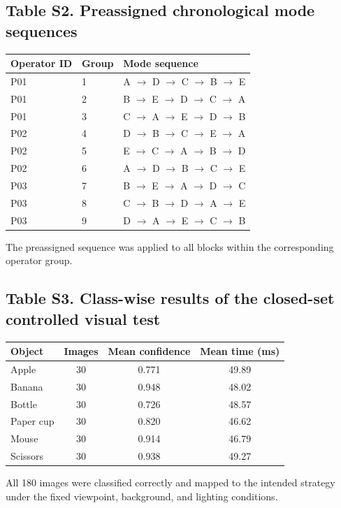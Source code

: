 \documentclass[11pt]{article}
\begin{document}
\subsection*{Table S2. Preassigned chronological mode sequences}
\begin{tabular}{lll}
\toprule
Operator ID & Group & Mode sequence \\
\midrule
P01 & 1 & A $\rightarrow$ D $\rightarrow$ C $\rightarrow$ B $\rightarrow$ E \\
P01 & 2 & B $\rightarrow$ E $\rightarrow$ D $\rightarrow$ C $\rightarrow$ A \\
P01 & 3 & C $\rightarrow$ A $\rightarrow$ E $\rightarrow$ D $\rightarrow$ B \\
P02 & 4 & D $\rightarrow$ B $\rightarrow$ C $\rightarrow$ E $\rightarrow$ A \\
P02 & 5 & E $\rightarrow$ C $\rightarrow$ A $\rightarrow$ B $\rightarrow$ D \\
P02 & 6 & A $\rightarrow$ D $\rightarrow$ B $\rightarrow$ C $\rightarrow$ E \\
P03 & 7 & B $\rightarrow$ E $\rightarrow$ A $\rightarrow$ D $\rightarrow$ C \\
P03 & 8 & C $\rightarrow$ B $\rightarrow$ D $\rightarrow$ A $\rightarrow$ E \\
P03 & 9 & D $\rightarrow$ A $\rightarrow$ E $\rightarrow$ C $\rightarrow$ B \\
\bottomrule
\end{tabular}

\smallskip
\noindent The preassigned sequence was applied to all blocks within the corresponding operator group.

\subsection*{Table S3. Class-wise results of the closed-set controlled visual test}
\small
\begin{center}
\begin{tabular}{lccc}
\toprule
Object & Images & Mean confidence & Mean time (ms) \\
\midrule
Apple & 30 & 0.771 & 49.89 \\
Banana & 30 & 0.948 & 48.02 \\
Bottle & 30 & 0.726 & 48.57 \\
Paper cup & 30 & 0.820 & 46.62 \\
Mouse & 30 & 0.914 & 46.79 \\
Scissors & 30 & 0.938 & 49.27 \\
\bottomrule
\end{tabular}
\end{center}
\noindent All 180 images were classified correctly and mapped to the intended strategy under the fixed viewpoint, background, and lighting conditions.
\normalsize
\end{document}
